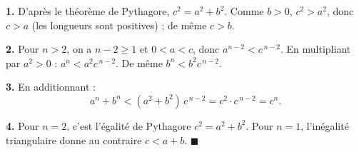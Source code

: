 \textbf{1.} D'après le théorème de Pythagore, $c^2 = a^2 + b^2$. Comme
$b > 0$, $c^2 > a^2$, donc $c > a$ (les longueurs sont positives) ; de même
$c > b$.

\textbf{2.} Pour $n > 2$, on a $n - 2 \geqslant 1$ et $0 < a < c$, donc
$a^{n-2} < c^{\,n-2}$. En multipliant par $a^2 > 0$ :
$a^n < a^2 c^{\,n-2}$. De même $b^n < b^2 c^{\,n-2}$.

\textbf{3.} En additionnant :
\[
a^n + b^n < (a^2 + b^2)\,c^{\,n-2} = c^2 \cdot c^{\,n-2} = c^n .
\]

\textbf{4.} Pour $n = 2$, c'est l'égalité de Pythagore $c^2 = a^2 + b^2$.
Pour $n = 1$, l'inégalité triangulaire donne au contraire $c < a + b$.
\hfill $\blacksquare$
